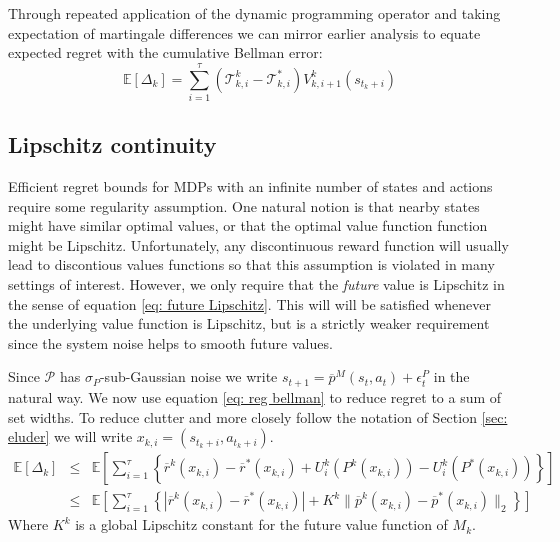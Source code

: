 \documentclass{article}
\newcommand{\Exp}{\mathds{E}}
\newcommand{\Pc}{\mathcal{P}}
\newcommand{\Tc}{\mathcal{T}}
\begin{document}
Through repeated application of the dynamic programming operator and taking expectation of martingale differences we can mirror earlier analysis \cite{osband2013more} to equate expected regret with the cumulative Bellman error:
\begin{equation}
\label{eq: reg bellman}
	\Exp [ \Delta_k ] = \sum_{i=1}^\tau (\Tc^k_{k,i}-\Tc^*_{k,i})V^k_{k,i+1}(s_{t_k+i})
\end{equation}


\subsection{Lipschitz continuity}
\label{sec: lipschitz}
Efficient regret bounds for MDPs with an infinite number of states and actions require some regularity assumption.
One natural notion is that nearby states might have similar optimal values, or that the optimal value function function might be Lipschitz.
Unfortunately, any discontinuous reward function will usually lead to discontious values functions so that this assumption is violated in many settings of interest.
However, we only require that the \emph{future} value is Lipschitz in the sense of equation \eqref{eq: future Lipschitz}.
This will will be satisfied whenever the underlying value function is Lipschitz, but is a strictly weaker requirement since the system noise helps to smooth future values.

Since $\Pc$ has $\sigma_P$-sub-Gaussian noise we write $s_{t+1} = \overline{p}^M(s_t,a_t)+\epsilon^P_t$ in the natural way.
We now use equation \eqref{eq: reg bellman} to reduce regret to a sum of set widths.
To reduce clutter and more closely follow the notation of Section \ref{sec: eluder} we will write $x_{k,i}=(s_{t_k+i},a_{t_k+i})$.
\begin{eqnarray}
	\Exp [ \Delta_k ] &\le& \Exp \left[ \sum_{i=1}^\tau \left\{  \overline{r}^k(x_{k,i}) - \overline{r}^*(x_{k,i})
	+  U^k_{i}(P^k(x_{k,i})) - U^k_{i}(P^*(x_{k,i})) \right\} \right] \nonumber \\
	&\le& \Exp\left[ \sum_{i=1}^\tau \left\{ | \overline{r}^k(x_{k,i}) - \overline{r}^*(x_{k,i})|
	+ K^k \|\overline{p}^k(x_{k,i}) - \overline{p}^*(x_{k,i}) \|_2 \right\}\right]
\end{eqnarray}
Where $K^k$ is a global Lipschitz constant for the future value function of $M_k$.
\end{document}
